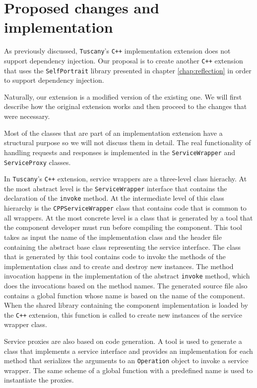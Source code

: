 \section{Proposed changes and implementation}

As previously discussed, \texttt{Tuscany}'s \texttt{C++} implementation extension does not support dependency injection. Our proposal is to
create another \texttt{C++} extension that uses the \texttt{SelfPortrait} library presented in chapter \ref{chap:reflection} in order
to support dependency injection. 

Naturally, our extension is a modified version of the existing one. We will first describe how the original extension works
and then proceed to the changes that were necessary.
 
Most of the classes that are part of an implementation extension have a structural purpose so we will not discuss them in
detail. The real functionality of handling requests and responses is implemented in the \texttt{ServiceWrapper} and 
\texttt{ServiceProxy} classes. 

In \texttt{Tuscany}'s \texttt{C++} extension, service wrappers are a three-level class hierachy. At the most abstract level is the
\texttt{ServiceWrapper} interface that contains the declaration of the \texttt{invoke} method. At the intermediate level of
this class hierarchy is the \texttt{CPPServiceWrapper} class that contains code that is common to all wrappers.
At the most concrete level is a class that is generated by a tool that the component developer must run before
compiling the component. This tool takes as input the name of the implementation class and the header file containing
the abstract base class representing the service interface. The class that is generated by this tool contains code
to invoke the methods of the implementation class and to create and destroy new instances. The method invocation
happens in the implementation of the abstract \texttt{invoke} method, which does the invocations based on the method names.
The generated source file also contains a global function whose name is based on the name of the component. When
the shared library containing the component implementation is loaded by the \texttt{C++} extension, this function is called
to create new instances of the service wrapper class.

Service proxies are also based on code generation. A tool is used to generate a class that implements a service interface
and provides an implementation for each method that serializes the arguments to an \texttt{Operation} object to invoke a service
wrapper. The same scheme of a global function with a predefined name is used to instantiate the proxies.

